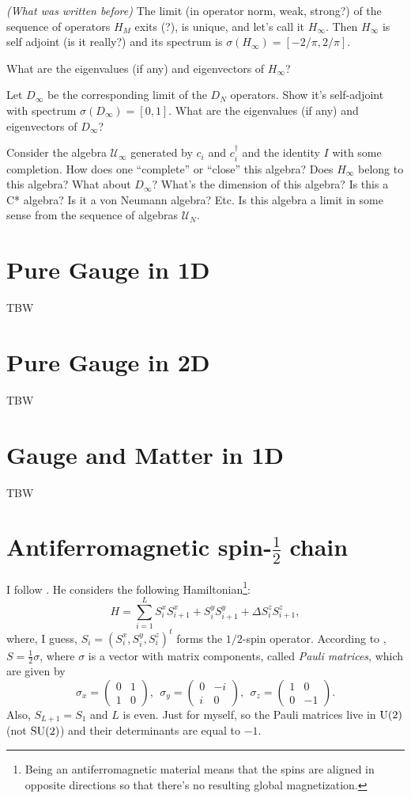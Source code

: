 {\scriptsize
\emph{(What was written before) }The limit (in operator norm, weak, strong?) of the sequence of operators $H_M$ exits (?), is unique, and let's call it $H_\infty$.
 	 	Then $H_\infty$ is self adjoint (is it really?) and its spectrum is $\sigma(H_\infty) = [-2/\pi, 2/\pi]$.
 	 	
 	 	What are the eigenvalues (if any) and eigenvectors of $H_\infty$?
 	 	
 	 	Let $D_\infty$ be the corresponding limit of the $D_N$ operators. Show it's self-adjoint with spectrum $\sigma(D_\infty) = [0, 1]$.
 	 	What are the eigenvalues (if any) and eigenvectors of $D_\infty$?
 	 	
 	 Consider the algebra $\mathcal{U}_\infty$ generated by $c_i$ and $c^\dagger_i$ and the identity $I$ with some completion.
 	 How does one ``complete'' or ``close'' this algebra?
 	 Does $H_\infty$ belong to this algebra? What about $D_\infty$?
 	 What's the dimension of this algebra? Is this a C* algebra? Is it a von Neumann algebra? Etc.
 	 Is this algebra a limit in some sense from the sequence of algebras $\mathcal{U}_N$.}
	
	
	\section{Pure Gauge in 1D}
TBW
	
	\section{Pure Gauge in 2D}
	TBW
	\section{Gauge and Matter in 1D}
	TBW
	
	
	\section{Antiferromagnetic spin-$\frac{1}{2}$ chain}
	I follow \cite{affleck}. He considers the following Hamiltonian\footnote{Being an antiferromagnetic material means that the spins are aligned in opposite directions so that there's no resulting global magnetization.}:
	\[
	H = \sum_{i=1}^L S_i^x S_{i+1}^x + S_i^y S_{i+1}^y + \Delta S_i^z S_{i+1}^z,
	\]
	where, I guess, $S_i = (S_i^x, S_i^y, S_i^z)^t$ forms the $1/2$-spin operator. According to \cite{landau}, $S = \frac{1}{2}\sigma$, where $\sigma$ is a vector with matrix components, called \emph{Pauli matrices}, which are given by
	\[
	\sigma_x = \begin{pmatrix} 0 & 1 \\ 1 & 0\end{pmatrix}, \ \ \sigma_y = \begin{pmatrix} 0 & -i \\ i & 0 \end{pmatrix}, \ \ \sigma_z = \begin{pmatrix} 1 & 0 \\ 0 & -1\end{pmatrix}.
	\]
	Also, $S_{L+1} = S_1$ and $L$ is even. Just for myself, so the Pauli matrices live in $\operatorname{U}(2)$ (not $\operatorname{SU}(2)$) and their determinants are equal to $-1$.
	
